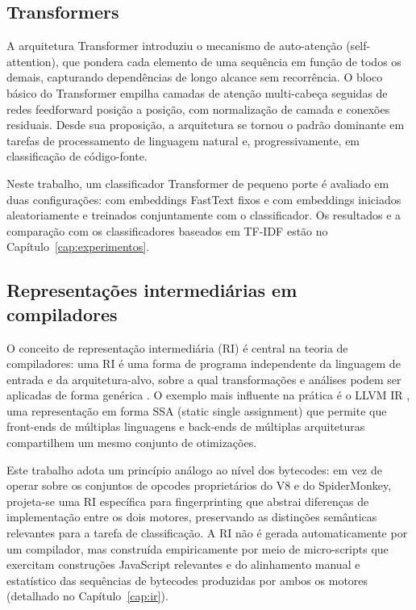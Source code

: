 \subsection{Transformers}
\label{sub:transformers}

A arquitetura Transformer \cite{vaswani2017} introduziu o mecanismo de
auto-atenção (self-attention), que pondera cada elemento de uma sequência em
função de todos os demais, capturando dependências de longo alcance sem recorrência.
O bloco básico do Transformer empilha camadas de atenção multi-cabeça seguidas de
redes feedforward posição a posição, com normalização de camada e conexões
residuais. Desde sua proposição, a arquitetura se tornou o padrão dominante em
tarefas de processamento de linguagem natural e, progressivamente, em classificação
de código-fonte.

Neste trabalho, um classificador Transformer de pequeno porte é avaliado em duas
configurações: com embeddings FastText fixos e com embeddings iniciados aleatoriamente
e treinados conjuntamente com o classificador. Os resultados e a comparação com os
classificadores baseados em TF-IDF estão no Capítulo~\ref{cap:experimentos}.

\subsection{Representações intermediárias em compiladores}
\label{sub:ri-compiladores}

O conceito de representação intermediária (RI) é central na teoria de compiladores:
uma RI é uma forma de programa independente da linguagem de entrada e da
arquitetura-alvo, sobre a qual transformações e análises podem ser aplicadas de
forma genérica \cite{aho2006}. O exemplo mais influente na prática é o LLVM IR
\cite{lattner2004}, uma representação em forma SSA (static single
assignment) que permite que front-ends de múltiplas linguagens e
back-ends de múltiplas arquiteturas compartilhem um mesmo conjunto de
otimizações.

Este trabalho adota um princípio análogo ao nível dos bytecodes: em vez de operar
sobre os conjuntos de opcodes proprietários do V8 e do SpiderMonkey, projeta-se uma
RI específica para fingerprinting que abstrai diferenças de implementação
entre os dois motores, preservando as distinções semânticas relevantes para a
tarefa de classificação. A RI não é gerada automaticamente por um compilador, mas
construída empiricamente por meio de micro-scripts que exercitam construções
JavaScript relevantes e do alinhamento manual e estatístico das sequências de
bytecodes produzidas por ambos os motores (detalhado no Capítulo~\ref{cap:ir}).

